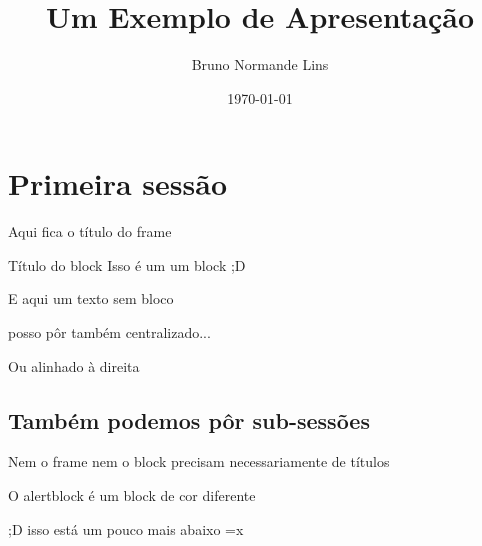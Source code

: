 \documentclass[11pt]{beamer}
\title{Um Exemplo de Apresentação}
\author[Bruno N. Lins]{Bruno Normande Lins}
\date{\today}
\begin{document}
	\begin{frame}{}
		\maketitle
	\end{frame}
	
	
	\section{Primeira sessão}
	
	\begin{frame}{Aqui fica o título do frame}
	
		\begin{block}{Título do block}
			Isso é um um block ;D
		\end{block}
		
		E aqui um texto sem bloco
		
		\begin{center}
			posso pôr também centralizado...
		\end{center}
		
		\hfill Ou alinhado à direita	
		
	\end{frame}
	
	\subsection{Também podemos pôr sub-sessões}

		\begin{frame}{}
	
		\begin{block}{}
			Nem o frame nem o block precisam necessariamente de títulos
		\end{block}
		
		\pause 
		\begin{alertblock}{}
			\hfill O alertblock é um block de cor diferente
		\end{alertblock}
		
		\vspace{1.5cm}
		;D isso está um pouco mais abaixo =x			
		
	\end{frame}
	
\end{document}
